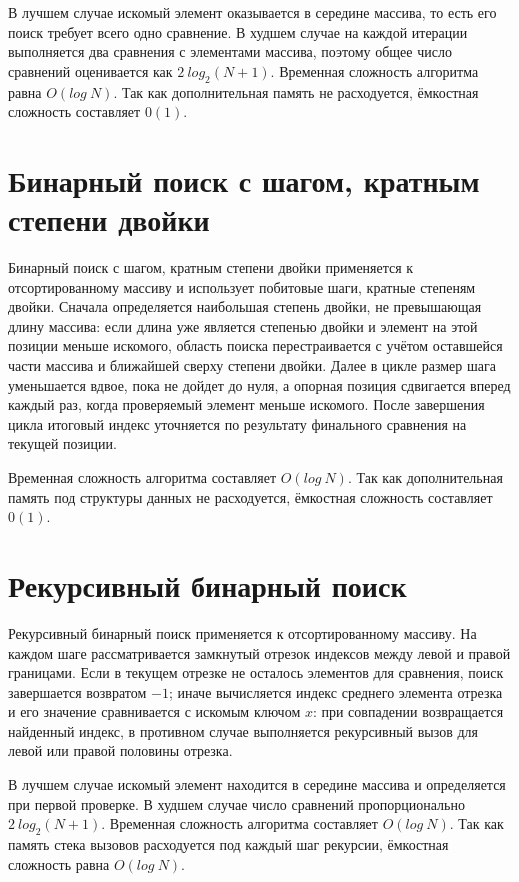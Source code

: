 В лучшем случае искомый элемент оказывается в середине массива, 
то есть его поиск требует всего одно сравнение. В худшем случае 
на каждой итерации выполняется два сравнения с элементами массива, 
поэтому общее число сравнений оценивается как $2~log_{2}(N+1)$. 
Временная сложность алгоритма равна $O(log~N)$. Так как 
дополнительная память не расходуется, ёмкостная сложность 
составляет $0(1)$.

\section{Бинарный поиск с шагом, кратным степени двойки}

Бинарный поиск с шагом, кратным степени двойки применяется к
отсортированному массиву и использует побитовые шаги, кратные 
степеням двойки. Сначала определяется наибольшая степень двойки, 
не превышающая длину массива: если длина уже является степенью 
двойки и элемент на этой позиции меньше искомого, область поиска 
перестраивается с учётом оставшейся части массива и ближайшей 
сверху степени двойки. Далее в цикле размер шага уменьшается вдвое, 
пока не дойдет до нуля, а опорная позиция сдвигается вперед 
каждый раз, когда проверяемый элемент меньше искомого. 
После завершения цикла итоговый индекс уточняется по результату 
финального сравнения на текущей позиции.

Временная сложность алгоритма составляет $O(log~N)$. Так как 
дополнительная память под структуры данных не расходуется, 
ёмкостная сложность составляет $0(1)$.

\section{Рекурсивный бинарный поиск}

Рекурсивный бинарный поиск применяется к отсортированному массиву.
На каждом шаге рассматривается замкнутый отрезок индексов между
левой и правой границами. Если в текущем отрезке не осталось
элементов для сравнения, поиск завершается возвратом $-1$; иначе
вычисляется индекс среднего элемента отрезка и его значение
сравнивается с искомым ключом $x$: при совпадении возвращается
найденный индекс, в противном случае выполняется рекурсивный
вызов для левой или правой половины отрезка.

В лучшем случае искомый элемент находится в середине 
массива и определяется при первой проверке. В худшем случае 
число сравнений пропорционально $2~log_{2}(N+1)$. Временная 
сложность алгоритма составляет $O(log~N)$. Так как память 
стека вызовов расходуется под каждый шаг рекурсии, ёмкостная 
сложность равна $O(log~N)$.

